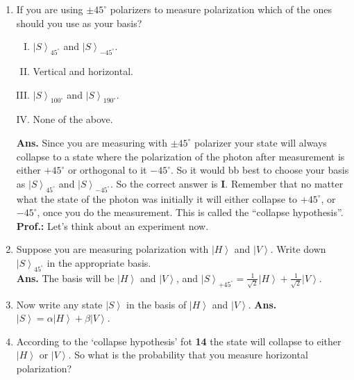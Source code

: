\documentclass[12pt]{article}
\newcommand\rr{\right \rangle}
\newcommand\ls{\left |}
\newcommand\tbf[1]{\textbf{#1}}
\newcommand\tp{\tbf{Prof.: }}
\begin{document}
\begin{enumerate}[1.]
\tp Then next question is which one should we choose? Well, we will choose the one that is most convenient for our measurement. For example, if we are using vertical and horizontal polarizers to measure the polarization states of a photon it would be best to choose $\ls V \rr$ and $\ls H \rr$ as our basis, $\ls S \rr = \alpha \ls V \rr + \beta \ls H \rr$. \newline
\item If you are using $\pm 45^\circ$ polarizers to measure polarization which of the ones should you use as your basis?
\begin{enumerate}[I.]
\item $\ls S \rr _{45^\circ}$ and $\ls S \rr _{-45^\circ}$.
\item Vertical and horizontal.
\item $\ls S \rr _{100^\circ}$ and $\ls S \rr _{190^\circ}$.
\item None of the above. \newline
\end{enumerate}
\tbf{Ans.} Since you are measuring with $\pm 45^\circ$ polarizer your state will always collapse to a state where the polarization of the photon after measurement is either $+45^\circ$ or orthogonal to it $-45^\circ$. So it would bb best to choose your basis as $\ls S \rr _{45^\circ}$ and $\ls S \rr _{-45^\circ}$. So the correct answer is \tbf{I}. Remember that no matter what the state of the photon was initially it will either collapse to $+45^\circ$, or $-45^\circ$, once you do the measurement. This is called the ``collapse hypothesis''. \newline
\tp Let's think about an experiment now.
\item Suppose you are measuring polarization with $\ls H \rr$ and $\ls V \rr$. Write down $\ls S \rr_{45^\circ}$ in the appropriate basis. \\ \newline
\tbf{Ans.} The basis will be $\ls H \rr$ and $\ls V \rr$, and $\ls S \rr _{+45^\circ} = \frac{1}{\sqrt{2}}\ls H \rr + \frac{1}{\sqrt{2}} \ls V \rr$.
\item Now write any state $\ls S \rr$ in the basis of $\ls H \rr$ and $\ls V \rr$. \newline
\tbf{Ans.} $\ls S \rr = \alpha \ls H \rr + \beta \ls V \rr$.
\item According to the `collapse hypothesis' fot \tbf{14} the state will collapse to either $\ls H \rr$ or $\ls V \rr$. So what is the probability that you measure horizontal polarization? \newline

\end{enumerate}
\end{document}
